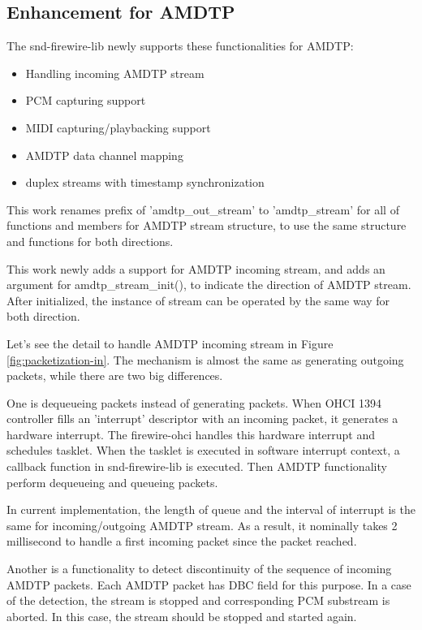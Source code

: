 \documentclass[onecolumn]{article}
\begin{document}
\subsection{Enhancement for AMDTP}

The snd-firewire-lib newly supports these functionalities for AMDTP:

\begin{itemize}
	\item Handling incoming AMDTP stream
	\item PCM capturing support
	\item MIDI capturing/playbacking support
	\item AMDTP data channel mapping
	\item duplex streams with timestamp synchronization
\end{itemize}

This work renames prefix of 'amdtp\_out\_stream' to 'amdtp\_stream' for all of functions and members for AMDTP stream structure, to use the same structure and functions for both directions.

This work newly adds a support for AMDTP incoming stream, and adds an argument for amdtp\_stream\_init(), to indicate the direction of AMDTP stream. After initialized, the instance of stream can be operated by the same way for both direction.

Let's see the detail to handle AMDTP incoming stream in Figure \ref{fig:packetization-in}. The mechanism is almost the same as generating outgoing packets, while there are two big differences.

One is dequeueing packets instead of generating packets. When OHCI 1394 controller fills an 'interrupt' descriptor with an incoming packet, it generates a hardware interrupt. The firewire-ohci handles this hardware interrupt and schedules tasklet. When the tasklet is executed in software interrupt context, a callback function in snd-firewire-lib is executed. Then AMDTP functionality perform dequeueing and queueing packets.

In current implementation, the length of queue and the interval of interrupt is the same for incoming/outgoing AMDTP stream. As a result, it nominally takes 2 millisecond to handle a first incoming packet since the packet reached.

Another is a functionality to detect discontinuity of the sequence of incoming AMDTP packets. Each AMDTP packet has DBC field for this purpose. In a case of the detection, the stream is stopped and corresponding PCM substream is aborted. In this case, the stream should be stopped and started again.
\end{document}
